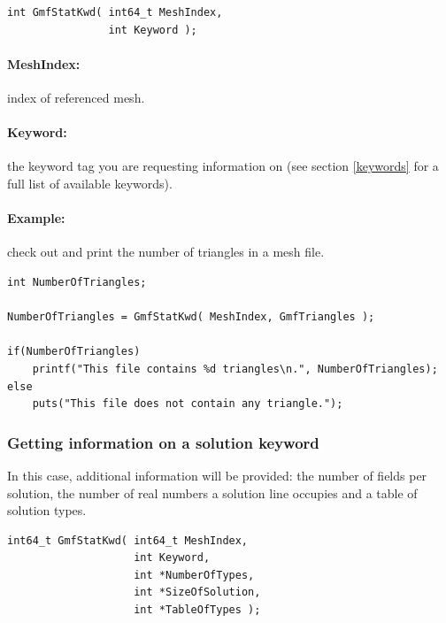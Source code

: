 \documentclass[a4paper,12pt]{article}
\begin{document}
\begin{tt}
\begin{verbatim}
int GmfStatKwd( int64_t MeshIndex,
                int Keyword );
\end{verbatim}
\end{tt}
\normalfont

\paragraph{MeshIndex:} index of referenced mesh.

\paragraph{Keyword:} the keyword tag you are requesting information on (see section \ref{keywords} for a full list of available keywords).

\paragraph{Example:} check out and print the number of triangles in a mesh file.

\begin{tt}
\begin{verbatim}
int NumberOfTriangles;

NumberOfTriangles = GmfStatKwd( MeshIndex, GmfTriangles );

if(NumberOfTriangles)
    printf("This file contains %d triangles\n.", NumberOfTriangles);
else
    puts("This file does not contain any triangle.");
\end{verbatim}
\end{tt}
\normalfont

\subsubsection{Getting information on a solution keyword}
In this case, additional information will be provided: the number of fields per solution, the number of real numbers a solution line occupies and a table of solution types.

\begin{tt}
\begin{verbatim}
int64_t GmfStatKwd( int64_t MeshIndex,
                    int Keyword,
                    int *NumberOfTypes,
                    int *SizeOfSolution,
                    int *TableOfTypes );
\end{verbatim}
\end{tt}
\normalfont
\end{document}
